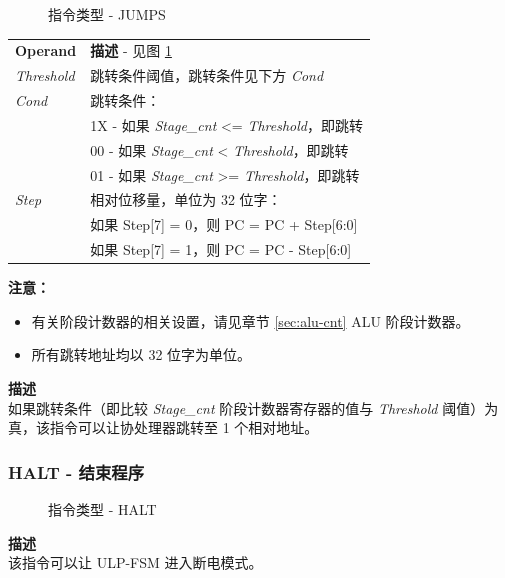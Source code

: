 \documentclass[main\_\_CN.tex]{subfiles}
\begin{document}
%
%
%
%
%
\begin{figure}[H]
    \centering
    \caption{指令类型 - JUMPS}
    \label{fig:JUMPS}
\end{figure}

\vspace{-2em}
\begin{tabular}{ l l }
\textbf{Operand} & \textbf{描述} - 见图 \ref{fig:JUMPS} \\
\textit{Threshold} & 跳转条件阈值，跳转条件见下方 \textit{Cond}\\
\textit{Cond} & 跳转条件： \\
 & 1X - 如果 \textit{Stage\_cnt} <= \textit{Threshold}，即跳转 \\
 & 00 - 如果 \textit{Stage\_cnt} < \textit{Threshold}，即跳转 \\
 & 01 - 如果 \textit{Stage\_cnt} >= \textit{Threshold}，即跳转\\
 \textit{Step} & 相对位移量，单位为 32 位字： \\
 & 如果 Step[7] = 0，则 PC = PC + Step[6:0] \\
 & 如果 Step[7] = 1，则 PC = PC - Step[6:0] \\
\end{tabular}

\textbf{注意：}
\begin{itemize}
    \item 有关阶段计数器的相关设置，请见章节 \ref{sec:alu-cnt} ALU 阶段计数器。
    \item 所有跳转地址均以 32 位字为单位。
\end{itemize}

\textbf{描述} \\
如果跳转条件（即比较 \textit{Stage\_cnt} 阶段计数器寄存器的值与 \textit{Threshold} 阈值）为真，该指令可以让协处理器跳转至 1 个相对地址。


\subsubsection{HALT - 结束程序} \label{sec:HALT}

%
%
\begin{figure}[H]
    \centering
    \caption{指令类型 - HALT}
    \label{fig:HALT}
\end{figure}

\vspace{-2em}
\textbf{描述} \\
该指令可以让 ULP-FSM 进入断电模式。
\end{document}
